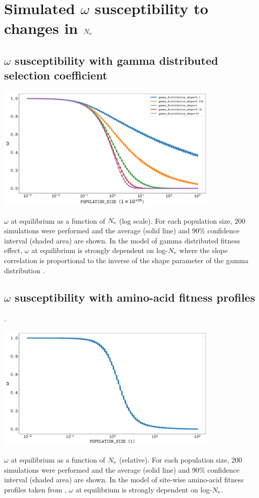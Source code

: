 \documentclass{article}
\renewcommand*{\bm}[1]{#1}%
\begin{document}
\section{Simulated $\bm{\omega}$ susceptibility to changes in $\bm{\Ne}$}
\subsection{$\bm{\omega}$ susceptibility with gamma distributed selection coefficient}
\begin{center}
 \includegraphics[width=0.8\textwidth] {artworks/SimuDfe-Elasticity.pdf}
\end{center}
$\omega$ at equilibrium as a function of $\bm{\Ne}$ (log scale).
For each population size, $200$ simulations were performed and the average (solid line) and $90\%$ confidence interval (shaded area) are shown.
In the model of gamma distributed fitness effect, $\omega$ at equilibrium is strongly dependent on log-$N_{\mathrm{e}}$ where the slope correlation is proportional to the inverse of the shape parameter of the gamma distribution \citep{Welch2008}.

\subsection{$\bm{\omega}$ susceptibility with amino-acid fitness profiles}.
\begin{center}
 \includegraphics[width=0.8\textwidth] {artworks/SimuProfile-Elasticity.pdf}
\end{center}
$\omega$ at equilibrium as a function of $\bm{\Ne}$ (relative).
For each population size, $200$ simulations were performed and the average (solid line) and $90\%$ confidence interval (shaded area) are shown.
In the model of site-wise amino-acid fitness profiles taken from \citep{Bloom2017}, $\omega$ at equilibrium is strongly dependent on log-$N_{\mathrm{e}}$. 
\end{document}
